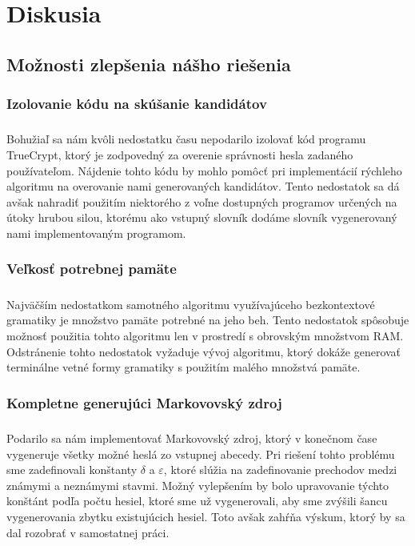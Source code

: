 \chapter{Diskusia}

\section{Možnosti zlepšenia nášho riešenia}
\subsection{Izolovanie kódu na skúšanie kandidátov}
\paragraph{}
Bohužiaľ sa nám kvôli nedostatku času nepodarilo izolovať kód programu TrueCrypt, ktorý je zodpovedný za overenie správnosti hesla zadaného používateľom. Nájdenie tohto kódu by mohlo pomôcť pri implementácií rýchleho algoritmu na overovanie nami generovaných kandidátov. Tento nedostatok sa dá avšak nahradiť použitím niektorého z voľne dostupných programov určených na útoky hrubou silou, ktorému ako vstupný slovník dodáme slovník vygenerovaný nami implementovaným programom.

\subsection{Veľkosť potrebnej pamäte}
\paragraph{}
Najväčším nedostatkom samotného algoritmu využívajúceho bezkontextové gramatiky je množstvo pamäte potrebné na jeho beh. Tento nedostatok spôsobuje možnosť použitia tohto algoritmu len v prostredí s obrovským množstvom RAM. Odstránenie tohto nedostatok vyžaduje vývoj algoritmu, ktorý dokáže generovať terminálne vetné formy gramatiky s použitím malého množstvá pamäte.

\subsection{Kompletne generujúci Markovovský zdroj}
\paragraph{}
Podarilo sa nám implementovať Markovovský zdroj, ktorý v konečnom čase vygeneruje všetky možné heslá zo vstupnej abecedy. Pri riešení tohto problému sme zadefinovali konštanty \(\delta\) a \(\varepsilon\), ktoré slúžia na zadefinovanie prechodov medzi známymi a neznámymi stavmi. Možný vylepšením by bolo upravovanie týchto konštánt podľa počtu hesiel, ktoré sme už vygenerovali, aby sme zvýšili šancu vygenerovania zbytku existujúcich hesiel. Toto avšak zahŕňa výskum, ktorý by sa dal rozobrať v samostatnej práci.
